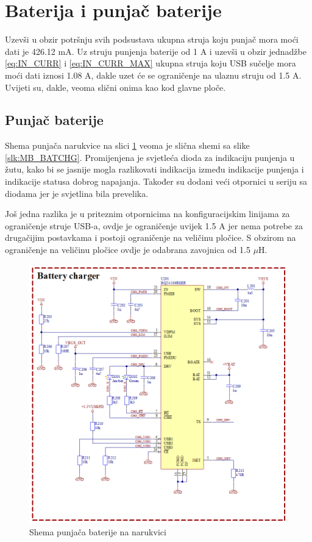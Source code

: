 \section{Baterija i punjač baterije}
\label{sec:BR_BATCHG}
Uzevši u obzir potršnju svih podsustava ukupna struja koju punjač mora moći dati je 426.12 mA. Uz struju punjenja baterije od 1 A i uzevši u obzir jednadžbe \ref{eq:IN_CURR} i \ref{eq:IN_CURR_MAX} ukupna struja koju USB sučelje mora moći dati iznosi 1.08 A, dakle uzet će se ograničenje na ulaznu struju od 1.5 A. Uvijeti su, dakle, veoma slični onima kao kod glavne ploče.

\subsection{Punjač baterije}
Shema punjača narukvice na slici \ref{slk:BR_BATCHG} veoma je slična shemi sa slike \ref{slk:MB_BATCHG}. Promijenjena je svjetleća dioda za indikaciju punjenja u žutu, kako bi se jasnije mogla razlikovati indikacija između indikacije punjenja i indikacije statusa dobrog napajanja. Također su dodani veći otpornici u seriju sa diodama jer je svjetlina bila prevelika.

Još jedna razlika je u priteznim otpornicima na konfiguracijskim linijama za ograničenje struje USB-a, ovdje je ograničenje uvijek 1.5 A jer nema potrebe za drugačijim postavkama i postoji ograničenje na veličinu pločice. S obzirom na ograničenje na veličinu pločice ovdje je odabrana zavojnica od 1.5 $\mu \textrm{H}$.
\begin{figure}[htb]
    \centering
    \includegraphics[width=\textwidth]{Figures/BR_BATCHG.png}
    \caption{Shema punjača baterije na narukvici}
    \label{slk:BR_BATCHG}
\end{figure}

